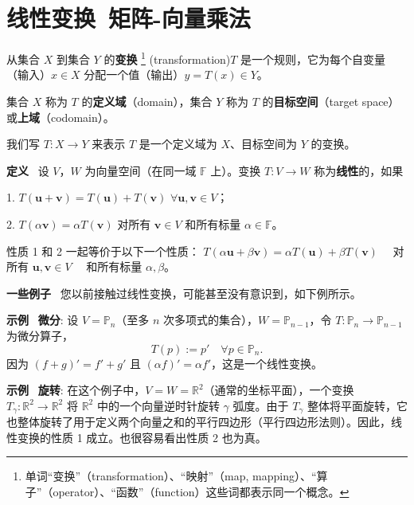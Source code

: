 \section{线性变换~矩阵-向量乘法}

从集合 $X$ 到集合 $Y$ 的\textbf{变换}
\footnote{
单词“变换”（transformation）、“映射”（map, mapping）、“算子”（operator）、“函数”（function）这些词都表示同一个概念。
} (transformation)$T$ 是一个规则，它为每个自变量（输入）$x \in X$ 分配一个值（输出）$y = T(x) \in Y$。

集合 $X$ 称为 $T$ 的\textbf{定义域}（domain），集合 $Y$ 称为 $T$ 的\textbf{目标空间}（target space）或\textbf{上域}（codomain）。

我们写 $T: X \to Y$ 来表示 $T$ 是一个定义域为 $X$、目标空间为 $Y$ 的变换。

\textbf{定义}~  设 $V$，$W$ 为向量空间（在同一域 $\mathbb{F}$ 上）。变换 $T: V \to W$ 称为\textbf{线性}的，如果

1. $T(\mathbf{u} + \mathbf{v}) = T(\mathbf{u}) + T(\mathbf{v})$ $\forall \mathbf{u}, \mathbf{v} \in V$；

2. $T(\alpha \mathbf{v}) = \alpha T(\mathbf{v})$ 对所有 $\mathbf{v} \in V$ 和所有标量 $\alpha \in \mathbb{F}$。


性质 1 和 2 一起等价于以下一个性质：
$T(\alpha \mathbf{u} + \beta \mathbf{v}) = \alpha T(\mathbf{u}) + \beta T(\mathbf{v})$ ~~对所有 $\mathbf{u}, \mathbf{v} \in V$ ~~和所有标量 $\alpha, \beta$。



\textbf{一些例子}~
您以前接触过线性变换，可能甚至没有意识到，如下例所示。

\textbf{示例}~ 
\textbf{微分}: 设 $V = \mathbb{P}_n$（至多 $n$ 次多项式的集合），$W = \mathbb{P}_{n-1}$，令 $T : \mathbb{P}_n \to \mathbb{P}_{n-1}$ 为微分算子，
$$ T(p) := p' \quad \forall p \in \mathbb{P}_n. $$
因为 $(f+g)' = f' + g'$ 且 $(\alpha f)' = \alpha f'$，这是一个线性变换。


\textbf{示例}~ 
\textbf{旋转}: 在这个例子中，$V = W = \mathbb{R}^2$（通常的坐标平面），一个变换 $T_\gamma : \mathbb{R}^2 \to \mathbb{R}^2$ 将 $\mathbb{R}^2$ 中的一个向量逆时针旋转 $\gamma$ 弧度。由于 $T_\gamma$ 整体将平面旋转，它也整体旋转了用于定义两个向量之和的平行四边形（平行四边形法则）。因此，线性变换的性质 1 成立。也很容易看出性质 2 也为真。




